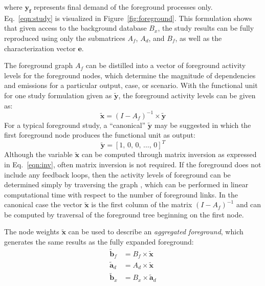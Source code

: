 where $\mathbf{y_f}$ represents final demand of the foreground processes only.  Eq.~\ref{eqn:study} is visualized in Figure~\ref{fig:foreground}.  This formulation shows that given access to the background database $B_x$, the study results can be fully reproduced using only the submatrices $A_f$, $A_d$, and $B_f$, as well as the characterization vector $\mathbf{e}$.  %

The foreground graph $A_f$ can be distilled into a vector of foreground activity levels for the foreground nodes, which determine the magnitude of dependencies and emissions for a particular output, case, or scenario.  With the functional unit for one study formulation given as $\tilde{\mathbf{y}}$, the foreground activity levels can be given as:
\begin{equation}
\tilde{\mathbf{x}} = (I - A_f)^{-1} \times \tilde{\mathbf{y}}
\label{eqn:inv}
\end{equation}
For a typical foreground study, a ``canonical'' $\tilde{\mathbf{y}}$ may be suggested in which the first foreground node produces the functional unit as output:
\begin{equation}
\tilde{\mathbf{y}} =  [ 1,\, 0,\, 0 ,\,\ldots,\, 0]^{T}
\end{equation}
Although the variable $\tilde{\mathbf{x}}$ can be computed through matrix inversion as expressed in Eq.~\ref{eqn:inv}, often matrix inversion is not required.  If the foreground does not include any feedback loops, then the activity levels of foreground can be determined simply by traversing the graph \citep{Bapat_LAA_2013}, which can be performed in linear computational time with respect to the number of foreground links.  In the canonical case the vector $\tilde{\mathbf{x}}$ is the first column of the matrix $(I-A_f)^{-1}$  and can be computed by traversal of the foreground tree beginning on the first node.

The node weights $\tilde{\mathbf{x}}$ can be used to describe an \emph{aggregated foreground}, which generates the same results as the fully expanded foreground:
\begin{equation}
\begin{array}{rl}
    \tilde{\mathbf{b}}_f & = B_f \times \tilde{\mathbf{x}} \\
    \tilde{\mathbf{a}}_d & = A_d \times \tilde{\mathbf{x}} \\
    \tilde{\mathbf{b}}_x & = B_x \times \tilde{\mathbf{a}}_d
\end{array}
\label{eqn:agg}
\end{equation}

